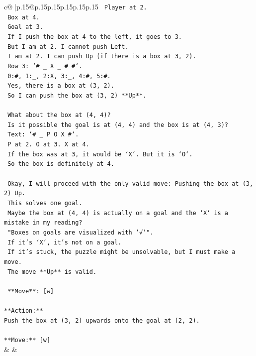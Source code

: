\documentclass{article}
\begin{document}
{\begin{supertabular}{c@{$\;$}|p{.15\linewidth}@{}p{.15\linewidth}p{.15\linewidth}p{.15\linewidth}p{.15\linewidth}p{.15\linewidth}}
{{{\texttt{     Player at 2.} \\
\texttt{     Box at 4.} \\
\texttt{     Goal at 3.} \\
\texttt{     If I push the box at 4 to the left, it goes to 3.} \\
\texttt{     But I am at 2. I cannot push Left.} \\
\texttt{     I am at 2. I can push Up (if there is a box at 3, 2).} \\
\texttt{     Row 3: `\# \_ X \_ \# \#`.} \\
\texttt{     0:\#, 1:\_, 2:X, 3:\_, 4:\#, 5:\#.} \\
\texttt{     Yes, there is a box at (3, 2).} \\
\texttt{     So I can push the box at (3, 2) **Up**.} \\
\\ 
\texttt{     What about the box at (4, 4)?} \\
\texttt{     Is it possible the goal is at (4, 4) and the box is at (4, 3)?} \\
\texttt{     Text: `\# \_ P O X \#`.} \\
\texttt{     P at 2. O at 3. X at 4.} \\
\texttt{     If the box was at 3, it would be `X`. But it is `O`.} \\
\texttt{     So the box is definitely at 4.} \\
\\ 
\texttt{     Okay, I will proceed with the only valid move: Pushing the box at (3, 2) Up.} \\
\texttt{     This solves one goal.} \\
\texttt{     Maybe the box at (4, 4) is actually on a goal and the `X` is a mistake in my reading?} \\
\texttt{     "Boxes on goals are visualized with '√'".} \\
\texttt{     If it's `X`, it's not on a goal.} \\
\texttt{     If it's stuck, the puzzle might be unsolvable, but I must make a move.} \\
\texttt{     The move **Up** is valid.} \\
\\ 
\texttt{     **Move**: {[}w{]}} \\
\\ 
\texttt{**Action:**} \\
\texttt{Push the box at (3, 2) upwards onto the goal at (2, 2).} \\
\\ 
\texttt{**Move:** {[}w{]}} \\
            }
        }
    }
    & & \\ \\


\end{supertabular}}
\end{document}
